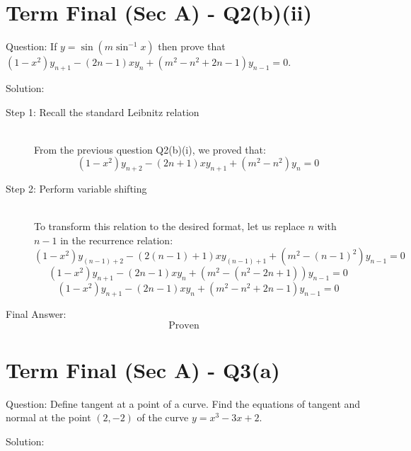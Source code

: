 \documentclass[11pt, a4paper]{article}
\begin{document}
\section*{Term Final (Sec A) - Q2(b)(ii)}

Question:
If $y = \sin(m\sin^{-1}x)$ then prove that $(1-x^2)y_{n+1} - (2n-1)xy_n + (m^2 - n^2 + 2n - 1)y_{n-1} = 0$.

Solution:

\begin{description}
    \item[Step 1: Recall the standard Leibnitz relation] \ \\
    From the previous question Q2(b)(i), we proved that:
    \[ (1-x^2)y_{n+2} - (2n+1)xy_{n+1} + (m^2 - n^2)y_n = 0 \]

    \item[Step 2: Perform variable shifting] \ \\
    To transform this relation to the desired format, let us replace $n$ with $n-1$ in the recurrence relation:
    \[ (1-x^2)y_{(n-1)+2} - (2(n-1)+1)xy_{(n-1)+1} + (m^2 - (n-1)^2)y_{n-1} = 0 \]
    \[ (1-x^2)y_{n+1} - (2n-1)xy_n + (m^2 - (n^2 - 2n + 1))y_{n-1} = 0 \]
    \[ (1-x^2)y_{n+1} - (2n-1)xy_n + (m^2 - n^2 + 2n - 1)y_{n-1} = 0 \]
\end{description}

Final Answer:
\[ 
\boxed{\text{Proven}} 
\]



\section*{Term Final (Sec A) - Q3(a)}

Question:
Define tangent at a point of a curve. Find the equations of tangent and normal at the point $(2, -2)$ of the curve $y = x^3 - 3x + 2$.

Solution:
\end{document}
